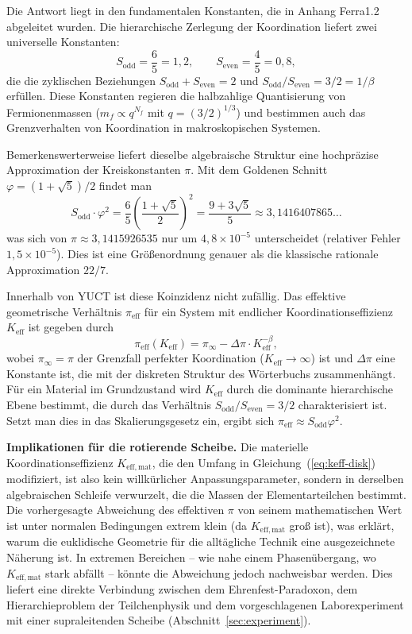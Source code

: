 \documentclass[12pt,a4paper]{article}
\begin{document}
	Die Antwort liegt in den fundamentalen Konstanten, die in Anhang Ferra1.2 abgeleitet wurden. Die hierarchische Zerlegung der Koordination liefert zwei universelle Konstanten:
	\[
	S_{\mathrm{odd}} = \frac{6}{5} = 1,2,\qquad S_{\mathrm{even}} = \frac{4}{5} = 0,8,
	\]
	die die zyklischen Beziehungen \(S_{\mathrm{odd}}+S_{\mathrm{even}}=2\) und \(S_{\mathrm{odd}}/S_{\mathrm{even}} = 3/2 = 1/\beta\) erfüllen. Diese Konstanten regieren die halbzahlige Quantisierung von Fermionenmassen (\(m_f \propto q^{N_f}\) mit \(q = (3/2)^{1/3}\)) und bestimmen auch das Grenzverhalten von Koordination in makroskopischen Systemen.
	
	Bemerkenswerterweise liefert dieselbe algebraische Struktur eine hochpräzise Approximation der Kreiskonstanten \(\pi\). Mit dem Goldenen Schnitt \(\varphi = (1+\sqrt{5})/2\) findet man
	\begin{equation}
		S_{\mathrm{odd}} \cdot \varphi^2 = \frac{6}{5} \left( \frac{1+\sqrt{5}}{2} \right)^2 
		= \frac{9+3\sqrt{5}}{5} \approx 3,1416407865\dots
	\end{equation}
	was sich von \(\pi \approx 3,1415926535\) nur um \(4,8\times10^{-5}\) unterscheidet (relativer Fehler \(1,5\times10^{-5}\)). Dies ist eine Größenordnung genauer als die klassische rationale Approximation \(22/7\).
	
	Innerhalb von YUCT ist diese Koinzidenz nicht zufällig. Das effektive geometrische Verhältnis \(\pi_{\mathrm{eff}}\) für ein System mit endlicher Koordinationseffizienz \(K_{\mathrm{eff}}\) ist gegeben durch
	\begin{equation}
		\pi_{\mathrm{eff}}(K_{\mathrm{eff}}) = \pi_{\infty} - \Delta\pi \cdot K_{\mathrm{eff}}^{-\beta},
	\end{equation}
	wobei \(\pi_{\infty} = \pi\) der Grenzfall perfekter Koordination (\(K_{\mathrm{eff}} \to \infty\)) ist und \(\Delta\pi\) eine Konstante ist, die mit der diskreten Struktur des Wörterbuchs zusammenhängt. Für ein Material im Grundzustand wird \(K_{\mathrm{eff}}\) durch die dominante hierarchische Ebene bestimmt, die durch das Verhältnis \(S_{\mathrm{odd}}/S_{\mathrm{even}} = 3/2\) charakterisiert ist. Setzt man dies in das Skalierungsgesetz ein, ergibt sich \(\pi_{\mathrm{eff}} \approx S_{\mathrm{odd}}\varphi^2\).
	
	\textbf{Implikationen für die rotierende Scheibe.} 
	Die materielle Koordinationseffizienz \(K_{\mathrm{eff,mat}}\), die den Umfang in Gleichung~(\ref{eq:keff-disk}) modifiziert, ist also kein willkürlicher Anpassungsparameter, sondern in derselben algebraischen Schleife verwurzelt, die die Massen der Elementarteilchen bestimmt. Die vorhergesagte Abweichung des effektiven \(\pi\) von seinem mathematischen Wert ist unter normalen Bedingungen extrem klein (da \(K_{\mathrm{eff,mat}}\) groß ist), was erklärt, warum die euklidische Geometrie für die alltägliche Technik eine ausgezeichnete Näherung ist. In extremen Bereichen – wie nahe einem Phasenübergang, wo \(K_{\mathrm{eff,mat}}\) stark abfällt – könnte die Abweichung jedoch nachweisbar werden. Dies liefert eine direkte Verbindung zwischen dem Ehrenfest-Paradoxon, dem Hierarchieproblem der Teilchenphysik und dem vorgeschlagenen Laborexperiment mit einer supraleitenden Scheibe (Abschnitt~\ref{sec:experiment}).
	
\end{document}
